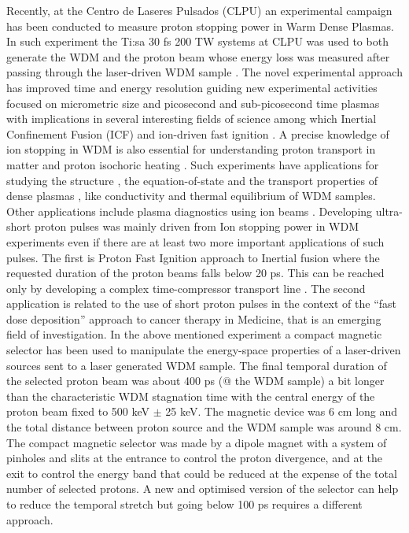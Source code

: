 \documentclass{cup-hpl}
\begin{document}
Recently, at the Centro de Laseres Pulsados (CLPU) an experimental campaign has been conducted to measure proton stopping power in Warm Dense Plasmas. In such experiment the Ti:sa 30 fs 200 TW systems at CLPU was used to both generate the WDM and the proton beam whose energy loss was measured after passing through the laser-driven WDM sample \cite{Mal22}. The novel experimental approach has improved time and energy resolution guiding new experimental activities focused on micrometric size and picosecond and sub-picosecond time plasmas with implications in several interesting fields of science among which Inertial Confinement Fusion (ICF) \cite{hur19,zyl22} and ion-driven fast ignition \cite{rot01,Fer14}. A precise knowledge of ion stopping in WDM is also essential for understanding proton transport in matter \cite{kim15} and proton isochoric heating \cite{patel2003,mcg20}. Such experiments have applications for studying the structure \cite{man10}, the equation-of-state \cite{pin19} and the transport properties of dense plasmas \cite{gra20}, like conductivity \cite{pin19,mck17} and thermal equilibrium \cite{whi12} of WDM samples. Other applications include plasma diagnostics using ion beams \cite{mac06,vol11}. Developing ultra-short proton pulses was mainly driven from Ion stopping power in WDM experiments even if there are at least two more important applications of such pulses.  The first is Proton Fast Ignition approach to Inertial fusion \cite{rot01} where the requested duration of the proton beams falls below 20 ps. This can be reached only by developing a complex time-compressor transport line \cite{he15}. The second application is related to the use of short proton pulses in the context of the “fast dose deposition” \cite{ras21} approach to cancer therapy in Medicine, that is an emerging field of investigation.  
In the above mentioned experiment \cite{Mal22} a compact magnetic selector \cite{api21} has been used to manipulate the energy-space properties of a laser-driven sources sent to a laser generated WDM sample. The final temporal duration of the selected proton beam was about 400 ps (@ the WDM sample) a bit longer than the characteristic WDM stagnation time  with the central energy of the proton beam fixed to 500 keV $\pm$ 25 keV. The magnetic device was 6 cm long and the total distance between proton source and the WDM sample was around 8 cm. The compact magnetic selector was made by a dipole magnet with a system of pinholes and slits at the entrance to control the proton divergence, and at the exit to control the energy band that could be reduced at the expense of the total number of selected protons. A new and optimised version of the selector can help to reduce the temporal stretch but going below 100 ps requires a different approach.
\end{document}
